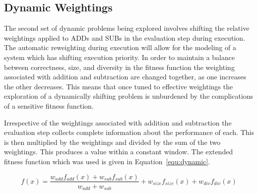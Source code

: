 \subsection{Dynamic Weightings}
The second set of dynamic problems being explored involves shifting the relative
weightings applied to ADDs and SUBs in the evaluation step during execution. The
automatic reweighting during execution will allow for the modeling of a system
which has shifting execution priority. In order to maintain a balance between
correctness, size, and diversity in the fitness function the weighting associated
with addition and subtraction are changed together, as one increases the other
decreases. This means that once tuned to effective weightings the exploration of
a dynamically shifting problem is unburdened by the complications of a sensitive
fitness function.

Irrespective of the weightings associated with addition and subtraction the
evaluation step collects complete information about the performance of each.
This is then multiplied by the weightings and divided by the sum of the two
weightings. This produces a value within a constant window. The extended fitness
function which was used is given in Equation~\ref{equ:dynamic}.

\begin{equation}
	\label{equ:dynamic}
	f(x) = \frac{w_{add} f_{add}(x) + w_{sub} f_{sub}(x)}{w_{add} + w_{sub}} + w_{size} f_{size}(x) +
	w_{div} f_{div}(x)
\end{equation}

